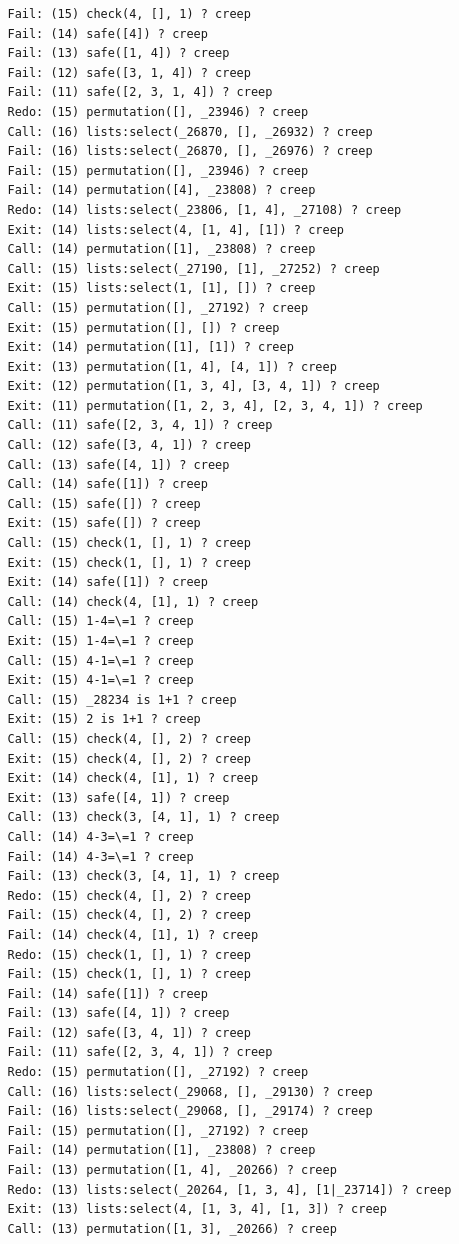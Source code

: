 \documentclass{article}
\begin{document}
\begin{verbatim}
   Fail: (15) check(4, [], 1) ? creep
   Fail: (14) safe([4]) ? creep
   Fail: (13) safe([1, 4]) ? creep
   Fail: (12) safe([3, 1, 4]) ? creep
   Fail: (11) safe([2, 3, 1, 4]) ? creep
   Redo: (15) permutation([], _23946) ? creep
   Call: (16) lists:select(_26870, [], _26932) ? creep
   Fail: (16) lists:select(_26870, [], _26976) ? creep
   Fail: (15) permutation([], _23946) ? creep
   Fail: (14) permutation([4], _23808) ? creep
   Redo: (14) lists:select(_23806, [1, 4], _27108) ? creep
   Exit: (14) lists:select(4, [1, 4], [1]) ? creep
   Call: (14) permutation([1], _23808) ? creep
   Call: (15) lists:select(_27190, [1], _27252) ? creep
   Exit: (15) lists:select(1, [1], []) ? creep
   Call: (15) permutation([], _27192) ? creep
   Exit: (15) permutation([], []) ? creep
   Exit: (14) permutation([1], [1]) ? creep
   Exit: (13) permutation([1, 4], [4, 1]) ? creep
   Exit: (12) permutation([1, 3, 4], [3, 4, 1]) ? creep
   Exit: (11) permutation([1, 2, 3, 4], [2, 3, 4, 1]) ? creep
   Call: (11) safe([2, 3, 4, 1]) ? creep
   Call: (12) safe([3, 4, 1]) ? creep
   Call: (13) safe([4, 1]) ? creep
   Call: (14) safe([1]) ? creep
   Call: (15) safe([]) ? creep
   Exit: (15) safe([]) ? creep
   Call: (15) check(1, [], 1) ? creep
   Exit: (15) check(1, [], 1) ? creep
   Exit: (14) safe([1]) ? creep
   Call: (14) check(4, [1], 1) ? creep
   Call: (15) 1-4=\=1 ? creep
   Exit: (15) 1-4=\=1 ? creep
   Call: (15) 4-1=\=1 ? creep
   Exit: (15) 4-1=\=1 ? creep
   Call: (15) _28234 is 1+1 ? creep
   Exit: (15) 2 is 1+1 ? creep
   Call: (15) check(4, [], 2) ? creep
   Exit: (15) check(4, [], 2) ? creep
   Exit: (14) check(4, [1], 1) ? creep
   Exit: (13) safe([4, 1]) ? creep
   Call: (13) check(3, [4, 1], 1) ? creep
   Call: (14) 4-3=\=1 ? creep
   Fail: (14) 4-3=\=1 ? creep
   Fail: (13) check(3, [4, 1], 1) ? creep
   Redo: (15) check(4, [], 2) ? creep
   Fail: (15) check(4, [], 2) ? creep
   Fail: (14) check(4, [1], 1) ? creep
   Redo: (15) check(1, [], 1) ? creep
   Fail: (15) check(1, [], 1) ? creep
   Fail: (14) safe([1]) ? creep
   Fail: (13) safe([4, 1]) ? creep
   Fail: (12) safe([3, 4, 1]) ? creep
   Fail: (11) safe([2, 3, 4, 1]) ? creep
   Redo: (15) permutation([], _27192) ? creep
   Call: (16) lists:select(_29068, [], _29130) ? creep
   Fail: (16) lists:select(_29068, [], _29174) ? creep
   Fail: (15) permutation([], _27192) ? creep
   Fail: (14) permutation([1], _23808) ? creep
   Fail: (13) permutation([1, 4], _20266) ? creep
   Redo: (13) lists:select(_20264, [1, 3, 4], [1|_23714]) ? creep
   Exit: (13) lists:select(4, [1, 3, 4], [1, 3]) ? creep
   Call: (13) permutation([1, 3], _20266) ? creep

\end{verbatim}
\end{document}
